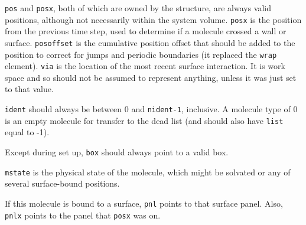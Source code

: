 \documentclass {book}
\begin{document}
\texttt{pos} and \texttt{posx}, both of which are owned by the structure, are always valid positions, although not necessarily within the system volume.  \texttt{posx} is the position from the previous time step, used to determine if a molecule crossed a wall or surface.  \texttt{posoffset} is the cumulative position offset  that should be added to the position to correct for jumps and periodic boundaries (it replaced the \texttt{wrap} element).  \texttt{via} is the location of the most recent surface interaction. It is work space and so should not be assumed to represent anything, unless it was just set to that value.

\texttt{ident} should always be between 0 and \texttt{nident-1}, inclusive. A molecule type of 0 is an empty molecule for transfer to the dead list (and should also have \texttt{list} equal to -1).

Except during set up, \texttt{box} should always point to a valid box.

\texttt{mstate} is the physical state of the molecule, which might be solvated or any of several surface-bound positions.

If this molecule is bound to a surface, \texttt{pnl} points to that surface panel.  Also, \texttt{pnlx} points to the panel that \texttt{posx} was on.
\end{document}
